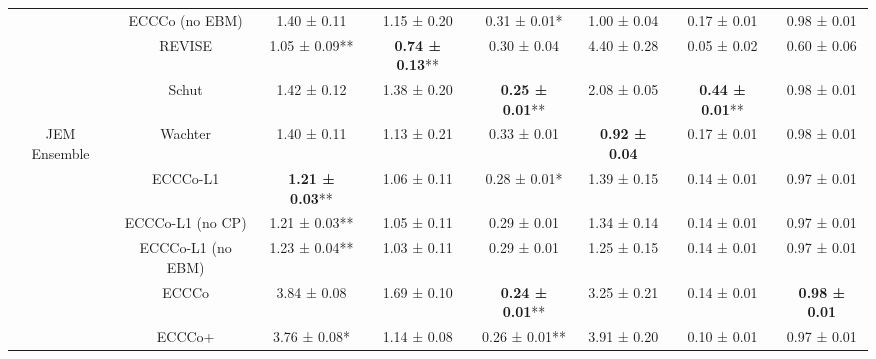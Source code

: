 \begin{table}
{\begin{tabular}[t]{cccccccc}
 & ECCCo (no EBM) & 1.40 ± 0.11\hphantom{*}\hphantom{*} & 1.15 ± 0.20\hphantom{*}\hphantom{*} & 0.31 ± 0.01*\hphantom{*} & 1.00 ± 0.04\hphantom{*}\hphantom{*} & 0.17 ± 0.01\hphantom{*}\hphantom{*} & 0.98 ± 0.01\hphantom{*}\hphantom{*}\\

 & REVISE & 1.05 ± 0.09** & \textbf{0.74 ± 0.13}** & 0.30 ± 0.04\hphantom{*}\hphantom{*} & 4.40 ± 0.28\hphantom{*}\hphantom{*} & 0.05 ± 0.02\hphantom{*}\hphantom{*} & 0.60 ± 0.06\hphantom{*}\hphantom{*}\\

 & Schut & 1.42 ± 0.12\hphantom{*}\hphantom{*} & 1.38 ± 0.20\hphantom{*}\hphantom{*} & \textbf{0.25 ± 0.01}** & 2.08 ± 0.05\hphantom{*}\hphantom{*} & \textbf{0.44 ± 0.01}** & 0.98 ± 0.01\hphantom{*}\hphantom{*}\\

\multirow[t]{-10}{*}{\centering\arraybackslash JEM Ensemble} & Wachter & 1.40 ± 0.11\hphantom{*}\hphantom{*} & 1.13 ± 0.21\hphantom{*}\hphantom{*} & 0.33 ± 0.01\hphantom{*}\hphantom{*} & \textbf{0.92 ± 0.04}\hphantom{*}\hphantom{*} & 0.17 ± 0.01\hphantom{*}\hphantom{*} & 0.98 ± 0.01\hphantom{*}\hphantom{*}\\
\cmidrule{1-8}
 & ECCCo-L1 & \textbf{1.21 ± 0.03}** & 1.06 ± 0.11\hphantom{*}\hphantom{*} & 0.28 ± 0.01*\hphantom{*} & 1.39 ± 0.15\hphantom{*}\hphantom{*} & 0.14 ± 0.01\hphantom{*}\hphantom{*} & 0.97 ± 0.01\hphantom{*}\hphantom{*}\\

 & ECCCo-L1 (no CP) & 1.21 ± 0.03** & 1.05 ± 0.11\hphantom{*}\hphantom{*} & 0.29 ± 0.01\hphantom{*}\hphantom{*} & 1.34 ± 0.14\hphantom{*}\hphantom{*} & 0.14 ± 0.01\hphantom{*}\hphantom{*} & 0.97 ± 0.01\hphantom{*}\hphantom{*}\\

 & ECCCo-L1 (no EBM) & 1.23 ± 0.04** & 1.03 ± 0.11\hphantom{*}\hphantom{*} & 0.29 ± 0.01\hphantom{*}\hphantom{*} & 1.25 ± 0.15\hphantom{*}\hphantom{*} & 0.14 ± 0.01\hphantom{*}\hphantom{*} & 0.97 ± 0.01\hphantom{*}\hphantom{*}\\

 & ECCCo & 3.84 ± 0.08\hphantom{*}\hphantom{*} & 1.69 ± 0.10\hphantom{*}\hphantom{*} & \textbf{0.24 ± 0.01}** & 3.25 ± 0.21\hphantom{*}\hphantom{*} & 0.14 ± 0.01\hphantom{*}\hphantom{*} & \textbf{0.98 ± 0.01}\hphantom{*}\hphantom{*}\\

 & ECCCo+ & 3.76 ± 0.08*\hphantom{*} & 1.14 ± 0.08\hphantom{*}\hphantom{*} & 0.26 ± 0.01** & 3.91 ± 0.20\hphantom{*}\hphantom{*} & 0.10 ± 0.01\hphantom{*}\hphantom{*} & 0.97 ± 0.01\hphantom{*}\hphantom{*}\\


\end{tabular}}
\end{table}
